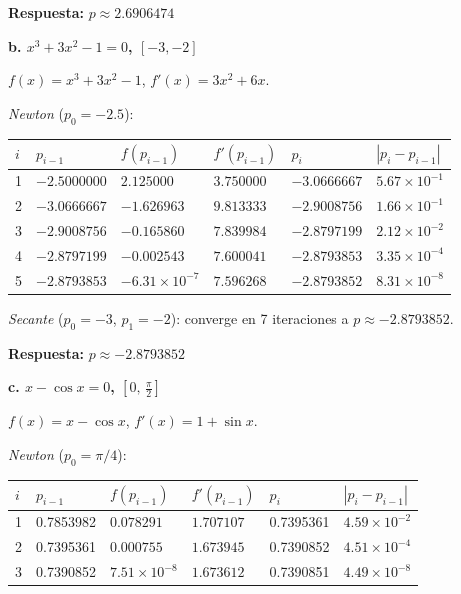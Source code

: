 \documentclass[12pt,a4paper]{article}
\begin{document}
\textbf{Respuesta:} $p \approx \boxed{2.6906474}$

\vspace{0.3cm}
\textbf{b. $x^3 + 3x^2 - 1 = 0$, $[-3, -2]$}

$f(x) = x^3 + 3x^2 - 1$, \quad $f'(x) = 3x^2 + 6x$.

\textit{Newton} ($p_0 = -2.5$):

\begin{center}\small
\begin{tabular}{C{0.5cm}C{2.5cm}C{2.5cm}C{2.5cm}C{2.5cm}C{1.8cm}}
\toprule
$i$ & $p_{i-1}$ & $f(p_{i-1})$ & $f'(p_{i-1})$ & $p_i$ & $|p_i - p_{i-1}|$ \\
 & $-2.5000000$ & $2.125000$ & $3.750000$ & $-3.0666667$ & $5.67\times10^{-1}$ \\
2 & $-3.0666667$ & $-1.626963$ & $9.813333$ & $-2.9008756$ & $1.66\times10^{-1}$ \\
3 & $-2.9008756$ & $-0.165860$ & $7.839984$ & $-2.8797199$ & $2.12\times10^{-2}$ \\
4 & $-2.8797199$ & $-0.002543$ & $7.600041$ & $-2.8793853$ & $3.35\times10^{-4}$ \\
5 & $-2.8793853$ & $-6.31\times10^{-7}$ & $7.596268$ & $-2.8793852$ & $8.31\times10^{-8}$ \\
\bottomrule
\end{tabular}
\end{center}

\textit{Secante} ($p_0=-3$, $p_1=-2$): converge en 7 iteraciones a $p \approx -2.8793852$.

\textbf{Respuesta:} $p \approx \boxed{-2.8793852}$

\vspace{0.3cm}
\textbf{c. $x - \cos x = 0$, $\left[0,\,\tfrac{\pi}{2}\right]$}

$f(x) = x - \cos x$, \quad $f'(x) = 1 + \sin x$.

\textit{Newton} ($p_0 = \pi/4$):

\begin{center}\small
\begin{tabular}{C{0.5cm}C{2.5cm}C{2.5cm}C{2.5cm}C{2.5cm}C{1.8cm}}
\toprule
$i$ & $p_{i-1}$ & $f(p_{i-1})$ & $f'(p_{i-1})$ & $p_i$ & $|p_i - p_{i-1}|$ \\
 & 0.7853982 & $0.078291$ & $1.707107$ & 0.7395361 & $4.59\times10^{-2}$ \\
2 & 0.7395361 & $0.000755$ & $1.673945$ & 0.7390852 & $4.51\times10^{-4}$ \\
3 & 0.7390852 & $7.51\times10^{-8}$ & $1.673612$ & 0.7390851 & $4.49\times10^{-8}$ \\
\bottomrule
\end{tabular}
\end{center}
\end{document}
